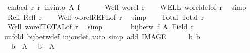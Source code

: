 \begin{isabellebody}
\ {\isachardoublequoteopen}embed\ r{\isacharprime}{\kern0pt}\ r\ {\isacharparenleft}{\kern0pt}inv{\isacharunderscore}{\kern0pt}into\ A\ f{\isacharparenright}{\kern0pt}{\isachardoublequoteclose}\isanewline
%
\isadelimproof
%
\endisadelimproof
%
\isatagproof
{}\isamarkupfalse%
{\isacharminus}{\kern0pt}\isanewline
\ \ \isanewline
\ \ \isamarkupfalse%
\ Well{\isacharcolon}{\kern0pt}\ {\isachardoublequoteopen}wo{\isacharunderscore}{\kern0pt}rel\ r{\isachardoublequoteclose}\isanewline
\ \ \isamarkupfalse%
\ WELL\ wo{\isacharunderscore}{\kern0pt}rel{\isacharunderscore}{\kern0pt}def{\isacharbrackleft}{\kern0pt}of\ r{\isacharbrackright}{\kern0pt}\ \isamarkupfalse%
\ simp\isanewline
\ \ \isamarkupfalse%
\ Refl{\isacharcolon}{\kern0pt}\ {\isachardoublequoteopen}Refl\ r{\isachardoublequoteclose}\isanewline
\ \ \isamarkupfalse%
\ Well\ wo{\isacharunderscore}{\kern0pt}rel{\isachardot}{\kern0pt}REFL{\isacharbrackleft}{\kern0pt}of\ r{\isacharbrackright}{\kern0pt}\ \isamarkupfalse%
\ simp\isanewline
\ \ \isamarkupfalse%
\ Total{\isacharcolon}{\kern0pt}\ {\isachardoublequoteopen}Total\ r{\isachardoublequoteclose}\isanewline
\ \ \isamarkupfalse%
\ Well\ wo{\isacharunderscore}{\kern0pt}rel{\isachardot}{\kern0pt}TOTAL{\isacharbrackleft}{\kern0pt}of\ r{\isacharbrackright}{\kern0pt}\ \isamarkupfalse%
\ simp\isanewline
\ \ \isanewline
\ \ \isamarkupfalse%
\ {}{\isacharcolon}{\kern0pt}\ {\isachardoublequoteopen}bij{\isacharunderscore}{\kern0pt}betw\ f\ A\ {\isacharparenleft}{\kern0pt}Field\ r{\isacharprime}{\kern0pt}{\isacharparenright}{\kern0pt}{\isachardoublequoteclose}\isanewline
\ \ \isamarkupfalse%
{\isacharparenleft}{\kern0pt}unfold\ bij{\isacharunderscore}{\kern0pt}betw{\isacharunderscore}{\kern0pt}def\ inj{\isacharunderscore}{\kern0pt}on{\isacharunderscore}{\kern0pt}def{\isacharcomma}{\kern0pt}\ auto\ simp\ add{\isacharcolon}{\kern0pt}\ IMAGE{\isacharparenright}{\kern0pt}\isanewline
\ \ \ \ \isamarkupfalse%
\ b{}\ b{}\isanewline
\ \ \ \ \isamarkupfalse%
\ {\isacharasterisk}{\kern0pt}{\isacharcolon}{\kern0pt}\ {\isachardoublequoteopen}b{}\ {\isasymin}\ A{\isachardoublequoteclose}\ \ {\isacharasterisk}{\kern0pt}{\isacharasterisk}{\kern0pt}{\isacharcolon}{\kern0pt}\ {\isachardoublequoteopen}b{}\ {\isasymin}\ A{\isachardoublequoteclose}\ \isanewline

\end{isabellebody}
